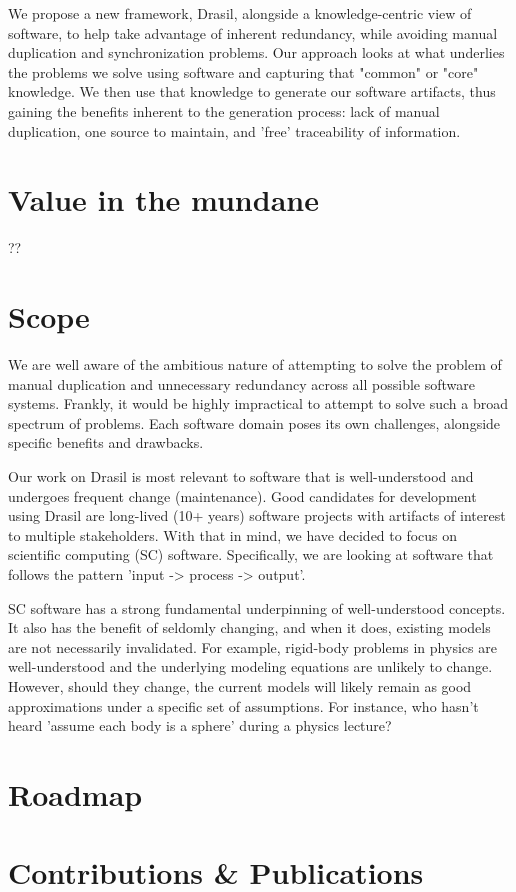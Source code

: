 We propose a new framework, Drasil, alongside a knowledge-centric view of
software, to help take advantage of inherent redundancy, while avoiding manual
duplication and synchronization problems. Our approach looks at what underlies
the problems we solve using software and capturing that "common" or "core"
knowledge. We then use that knowledge to generate our software artifacts, thus
gaining the benefits inherent to the generation process: lack of manual
duplication, one source to maintain, and 'free' traceability of information.

\section{Value in the mundane}
??

\section{Scope}
We are well aware of the ambitious nature of attempting to solve the problem of
manual duplication and unnecessary redundancy across all possible software
systems. Frankly, it would be highly impractical to attempt to solve such a
broad spectrum of problems. Each software domain poses its own challenges,
alongside specific benefits and drawbacks. 

Our work on Drasil is most relevant to software that is well-understood and 
undergoes frequent change (maintenance). Good candidates for development using
Drasil are long-lived (10+ years) software projects with artifacts of interest
to multiple stakeholders. With that in mind, we have decided to focus on
scientific computing (SC) software. Specifically, we are looking at software 
that follows the pattern 'input -> process -> output'.

SC software has a strong fundamental underpinning of well-understood concepts.
It also has the benefit of seldomly changing, and when it does, existing models
are not necessarily invalidated. For example, rigid-body problems in physics are
well-understood and the underlying modeling equations are unlikely to change.
However, should they change, the current models will likely remain as good
approximations under a specific set of assumptions. For instance, who hasn't
heard 'assume each body is a sphere' during a physics lecture?

\section{Roadmap}

\section{Contributions \& Publications}

